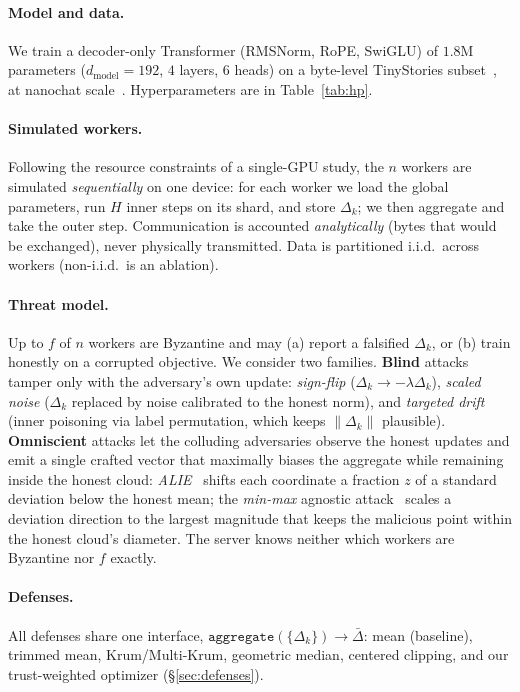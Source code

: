 \documentclass[11pt]{article}
\newcommand{\dg}{\Delta}          %
\newcommand{\agg}{\bar{\Delta}}   %
\begin{document}
\paragraph{Model and data.}
We train a decoder-only Transformer (RMSNorm, RoPE, SwiGLU) of $1.8$M parameters
($d_{\text{model}}{=}192$, $4$ layers, $6$ heads) on a byte-level TinyStories
subset~\citep{tinystories2023}, at nanochat scale~\citep{nanochatdiloco2025}. Hyperparameters
are in Table~\ref{tab:hp}.

\paragraph{Simulated workers.}
Following the resource constraints of a single-GPU study, the $n$ workers are simulated
\emph{sequentially} on one device: for each worker we load the global parameters, run $H$
inner steps on its shard, and store $\dg_k$; we then aggregate and take the outer step.
Communication is accounted \emph{analytically} (bytes that would be exchanged), never
physically transmitted. Data is partitioned i.i.d.\ across workers (non-i.i.d.\ is an
ablation).

\paragraph{Threat model.}
Up to $f$ of $n$ workers are Byzantine and may (a) report a falsified $\dg_k$, or (b) train
honestly on a corrupted objective. We consider two families. \textbf{Blind} attacks tamper
only with the adversary's own update: \emph{sign-flip} ($\dg_k \to -\lambda\dg_k$),
\emph{scaled noise} ($\dg_k$ replaced by noise calibrated to the honest norm), and
\emph{targeted drift} (inner poisoning via label permutation, which keeps $\|\dg_k\|$
plausible). \textbf{Omniscient} attacks let the colluding adversaries observe the honest
updates and emit a single crafted vector that maximally biases the aggregate while remaining
inside the honest cloud: \emph{ALIE}~\citep{alie2019} shifts each coordinate a fraction $z$
of a standard deviation below the honest mean; the \emph{min-max} agnostic
attack~\citep{minmax2021} scales a deviation direction to the largest magnitude that keeps the
malicious point within the honest cloud's diameter. The server knows neither which workers are
Byzantine nor $f$ exactly.

\paragraph{Defenses.}
All defenses share one interface, $\texttt{aggregate}(\{\dg_k\}) \to \agg$: mean (baseline),
trimmed mean, Krum/Multi-Krum, geometric median, centered clipping, and our trust-weighted
optimizer (\S\ref{sec:defenses}).
\end{document}
